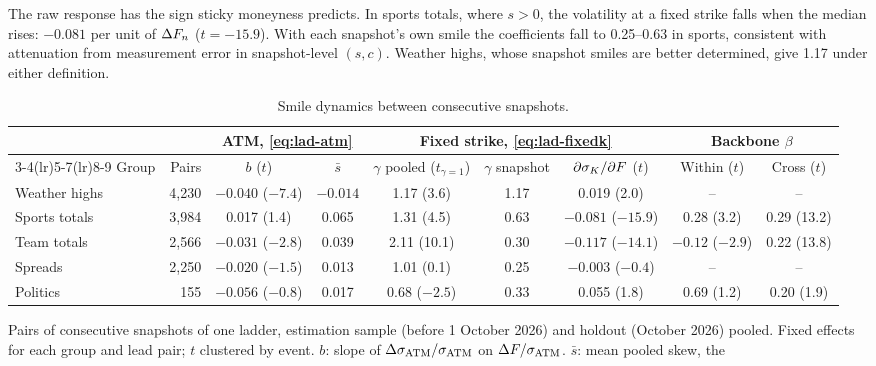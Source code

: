 The raw response has the sign sticky moneyness predicts. In sports totals, where $s>0$, the
volatility at a fixed strike falls when the median rises: $-0.081$ per unit of $\Delta F_n$
($t=-15.9$). With each snapshot's own smile the coefficients fall to 0.25--0.63 in sports,
consistent with attenuation from measurement error in snapshot-level $(s,c)$. Weather highs, whose
snapshot smiles are better determined, give 1.17 under either definition.

\begin{table}[t]
\centering\footnotesize
\setlength{\tabcolsep}{2.4pt}
\begin{threeparttable}
\caption{Smile dynamics between consecutive snapshots.}\label{tab:lad-dyn}
\begin{tabular}{@{}lrccccccc@{}}
\toprule
 & & \multicolumn{2}{c}{ATM, \eqref{eq:lad-atm}} & \multicolumn{3}{c}{Fixed strike, \eqref{eq:lad-fixedk}} & \multicolumn{2}{c}{Backbone $\beta$} \\
\cmidrule(lr){3-4}\cmidrule(lr){5-7}\cmidrule(lr){8-9}
Group & Pairs & $b$ ($t$) & $\bar s$ & $\gamma$ pooled ($t_{\gamma=1}$) & $\gamma$ snapshot & $\partial\sigma_K/\partial F$ ($t$) & Within ($t$) & Cross ($t$) \\
\midrule
Weather highs & 4,230 & $-0.040$ ($-7.4$) & $-0.014$ & 1.17 (3.6) & 1.17 & 0.019 (2.0) & -- & -- \\
Sports totals & 3,984 & 0.017 (1.4) & 0.065 & 1.31 (4.5) & 0.63 & $-0.081$ ($-15.9$) & 0.28 (3.2) & 0.29 (13.2) \\
Team totals   & 2,566 & $-0.031$ ($-2.8$) & 0.039 & 2.11 (10.1) & 0.30 & $-0.117$ ($-14.1$) & $-0.12$ ($-2.9$) & 0.22 (13.8) \\
Spreads       & 2,250 & $-0.020$ ($-1.5$) & 0.013 & 1.01 (0.1) & 0.25 & $-0.003$ ($-0.4$) & -- & -- \\
Politics      & 155   & $-0.056$ ($-0.8$) & 0.017 & 0.68 ($-2.5$) & 0.33 & 0.055 (1.8) & 0.69 (1.2) & 0.20 (1.9) \\
\bottomrule
\end{tabular}
\begin{tablenotes}[flushleft]\footnotesize
\item Pairs of consecutive snapshots of one ladder, estimation sample (before 1 October 2026) and
holdout (October 2026) pooled. Fixed effects for each group and lead pair; $t$ clustered by event.
$b$: slope of $\Delta\sigma_{\mathrm{ATM}}/\sigma_{\mathrm{ATM}}$ on $\Delta F/\sigma_{\mathrm{ATM}}$. $\bar s$: mean pooled skew, the

\end{tablenotes}
\end{threeparttable}
\end{table}
